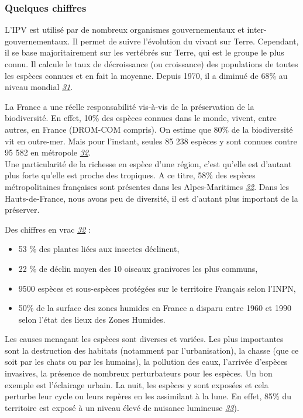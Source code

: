 \hypertarget{quelques-chiffres}{%
\subsubsection{Quelques chiffres}\label{quelques-chiffres}}

L'IPV est utilisé par de nombreux organismes gouvernementaux et
inter-gouvernementaux. Il permet de suivre l'évolution du vivant sur
Terre. Cependant, il se base majoritairement sur les vertébrés sur
Terre, qui est le groupe le plus connu. Il calcule le taux de
décroissance (ou croissance) des populations de toutes les espèces
connues et en fait la moyenne. Depuis 1970, il a diminué de 68\% au
niveau mondial
\emph{\href{https://www.wwf.fr/rapport-planete-vivante}{31}}.

La France a une réelle responsabilité vis-à-vis de la préservation de la
biodiversité. En effet, 10\% des espèces connues dans le monde, vivent,
entre autres, en France (DROM-COM compris). On estime que 80\% de la
biodiversité vit en outre-mer. Mais pour l'instant, seules 85 238
espèces y sont connues contre 95 582 en métropole
\emph{\href{https://inpn.mnhn.fr/docs/communication/livretInpn/LIVRET_INPN_2019.pdf}{32}}.\\
Une particularité de la richesse en espèce d'une région, c'est qu'elle
est d'autant plus forte qu'elle est proche des tropiques. A ce titre,
58\% des espèces métropolitaines françaises sont présentes dans les
Alpes-Maritimes
\emph{\href{https://inpn.mnhn.fr/docs/communication/livretInpn/LIVRET_INPN_2019.pdf}{32}}.
Dans les Hauts-de-France, nous avons peu de diversité, il est d'autant
plus important de la préserver.

Des chiffres en vrac
\emph{\href{https://inpn.mnhn.fr/docs/communication/livretInpn/LIVRET_INPN_2019.pdf}{32}}
:

\begin{itemize}
\tightlist
\item
  53 \% des plantes liées aux insectes déclinent,
\item
  22 \% de déclin moyen des 10 oiseaux granivores les plus communs,
\item
  9500 espèces et sous-espèces protégées sur le territoire Français
  selon l'INPN,
\item
  50\% de la surface des zones humides en France a disparu entre 1960 et
  1990 selon l'état des lieux des Zones Humides.
\end{itemize}

Les causes menaçant les espèces sont diverses et variées. Les plus
importantes sont la destruction des habitats (notamment par
l'urbanisation), la chasse (que ce soit par les chats ou par les
humains), la pollution des eaux, l'arrivée d'espèces invasives, la
présence de nombreux perturbateurs pour les espèces. Un bon exemple est
l'éclairage urbain. La nuit, les espèces y sont exposées et cela
perturbe leur cycle ou leurs repères en les assimilant à la lune. En
effet, 85\% du territoire est exposé à un niveau élevé de nuisance
lumineuse
\emph{\href{https://ofb.gouv.fr/actualites/un-nouvel-indicateur-pour-mesurer-la-pollution-lumineuse\#:~:text=Le\%20nouvel\%20indicateur\%20de\%20l,niveau\%20\%C3\%A9lev\%C3\%A9\%20de\%20pollution\%20lumineuse.}{33}}).

